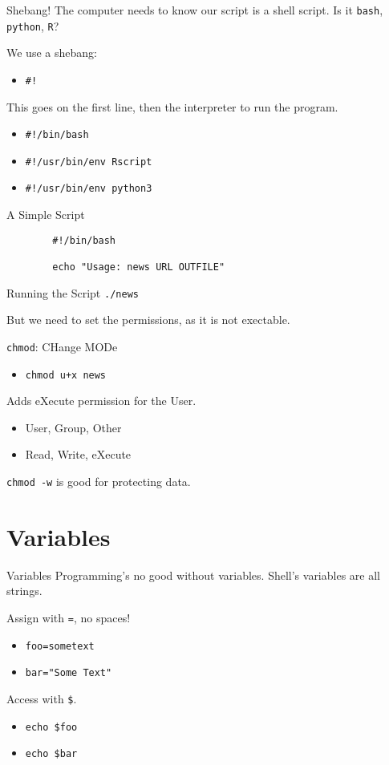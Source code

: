 \documentclass[pdf,usenames,dvipsnames,14pt]{beamer}%
\newcommand\hyphen{\char`\-}
\begin{document}
\begin{frame}{Shebang!}
	The computer needs to know our script is a shell script.
	Is it \texttt{bash}, \texttt{python}, \texttt{R}?
	
	We use a shebang:
	\begin{itemize}
		\item \texttt{\#!}
	\end{itemize}
	
	This goes on the first line, then the interpreter to run the program.
	\begin{itemize}
		\item \texttt{\#!/bin/bash}
		\item \texttt{\#!/usr/bin/env Rscript}
		\item \texttt{\#!/usr/bin/env python3}
	\end{itemize}
\end{frame}

\begin{frame}[fragile]{A Simple Script}
	\begin{verbatim}
		#!/bin/bash
		
		echo "Usage: news URL OUTFILE"
	\end{verbatim}
\end{frame}

\begin{frame}{Running the Script}
	\texttt{./news}
	
	But we need to set the permissions, as it is not exectable.
	
	\texttt{chmod}: CHange MODe
	\begin{itemize}
		\item \texttt{chmod u+x news}
	\end{itemize}
	Adds eXecute permission for the User.
	\begin{itemize}
		\item User, Group, Other
		\item Read, Write, eXecute
	\end{itemize}
	\texttt{chmod -w} is good for protecting data.
	\note{
		\texttt{ls \hyphen l}
	}
\end{frame}

\section{Variables}

\begin{frame}{Variables}
	Programming's no good without variables.
	Shell's variables are all strings.
	
	Assign with \texttt{=}, no spaces!
	\begin{itemize}
		\item \texttt{foo=sometext}
		\item \texttt{bar="Some Text"}
	\end{itemize}
	Access with \texttt{\$}.
	\begin{itemize}
		\item \texttt{echo \$foo}
		\item \texttt{echo \$bar}
	\end{itemize}
\end{frame}
\end{document}

